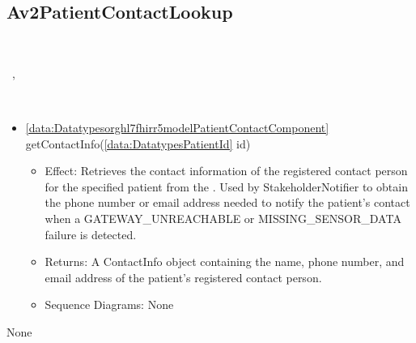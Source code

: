   \subsection{Av2PatientContactLookup}\label{int:InterfacesAv2PatientContactLookup}
    \begin{description}
      \item[Provided by:] \iconcomponent{}~
      \item[Required by:] \iconcomponent{}~, \iconcomponent{}~ 
      \item[Operations:] ~
    \begin{itemize}[noitemsep,nolistsep,leftmargin=-.25cm]
      \item \textsf{\ref{data:Datatypesorghl7fhirr5modelPatientContactComponent} getContactInfo(\ref{data:DatatypesPatientId} id)}
        \begin{itemize}[noitemsep,nolistsep]
           \item Effect: Retrieves the contact information of the registered contact person for the specified patient from the . Used by StakeholderNotifier to obtain the phone number or email address needed to notify the patient's contact when a GATEWAY\_UNREACHABLE or MISSING\_SENSOR\_DATA failure is detected. 
           \item Returns: A ContactInfo object containing the name, phone number, and email address of the patient's registered contact person.
           \item Sequence Diagrams: None
        \end{itemize}
    \end{itemize}
      \item[Diagrams:] None
    \end{description}

